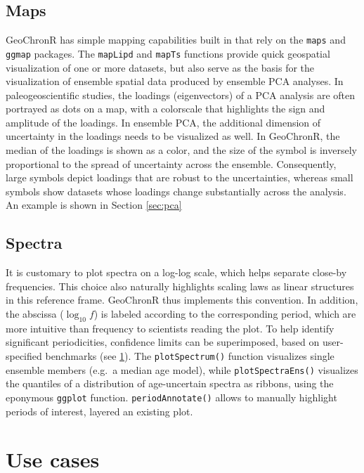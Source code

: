 \documentclass[gchron, manuscript]{copernicus}
\begin{document}
\subsection{Maps}

GeoChronR has simple mapping capabilities built in that rely on the \texttt{maps} \citep{maps} and \texttt{ggmap} \citep{ggmap} packages.
The \texttt{mapLipd} and \texttt{mapTs} functions provide quick geospatial visualization of one or more datasets, but also serve as the basis for the visualization of ensemble spatial data produced by ensemble PCA analyses.
In paleogeoscientific studies, the loadings (eigenvectors) of a PCA analysis are often portrayed as dots on a map, with a colorscale that highlights the sign and amplitude of the loadings.
In ensemble PCA, the additional dimension of uncertainty in the loadings needs to be visualized as well.
In GeoChronR, the median of the loadings is shown as a color, and the size of the symbol is inversely proportional to the spread of uncertainty across the ensemble.
Consequently, large symbols depict loadings that are robust to the uncertainties, whereas small symbols show datasets whose loadings change substantially across the analysis.
An example is shown in Section \ref{sec:pca}

\hypertarget{sec:spec_viz}{%
\subsection{Spectra}\label{sec:spec_viz}}

It is customary to plot spectra on a log-log scale, which helps separate close-by frequencies. This choice also naturally highlights scaling laws \citep[\citet{ZhuPNAS2019}]{lovejoy2013weather} as linear structures in this reference frame. GeoChronR thus implements this convention. In addition, the abscissa (\(\log_{10} f\)) is labeled according to the corresponding period, which are more intuitive than frequency to scientists reading the plot. To help identify significant periodicities, confidence limits can be superimposed, based on user-specified benchmarks (see \ref{sec:use-cases}). The \texttt{plotSpectrum()} function visualizes single ensemble members (e.g.~a median age model), while \texttt{plotSpectraEns()} visualizes the quantiles of a distribution of age-uncertain spectra as ribbons, using the eponymous \texttt{ggplot} function. \texttt{periodAnnotate()} allows to manually highlight periods of interest, layered an existing plot.

\hypertarget{sec:use-cases}{%
\section{Use cases}\label{sec:use-cases}}
\end{document}
